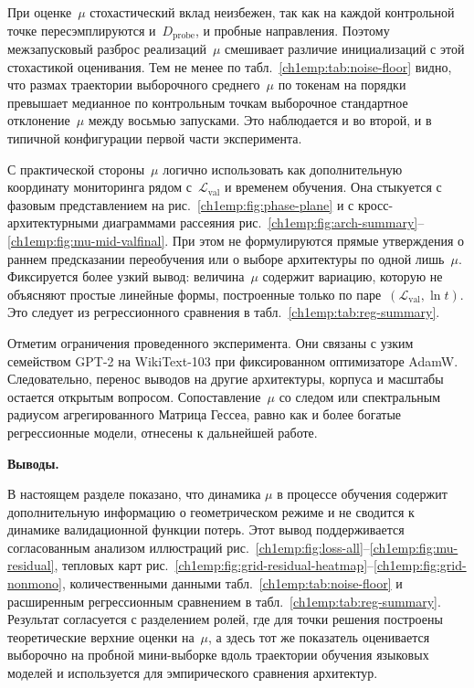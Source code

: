 При оценке~$\mu$ стохастический вклад неизбежен, так как на каждой контрольной точке пересэмплируются и~$D_{\mathrm{probe}}$, и пробные направления.
Поэтому межзапусковый разброс реализаций~$\mu$ смешивает различие инициализаций с этой стохастикой оценивания.
Тем не менее по табл.~\ref{ch1emp:tab:noise-floor} видно, что размах траектории выборочного среднего~$\mu$ по токенам на порядки превышает медианное по контрольным точкам выборочное стандартное отклонение~$\mu$ между восьмью запусками.
Это наблюдается и во второй, и в типичной конфигурации первой части эксперимента.

С практической стороны~$\mu$ логично использовать как дополнительную координату мониторинга рядом с~$\mathcal{L}_{\mathrm{val}}$ и временем обучения.
Она стыкуется с фазовым представлением на рис.~\ref{ch1emp:fig:phase-plane} и с кросс-архитектурными диаграммами рассеяния рис.~\ref{ch1emp:fig:arch-summary}--\ref{ch1emp:fig:mu-mid-valfinal}.
При этом не формулируются прямые утверждения о раннем предсказании переобучения или о выборе архитектуры по одной лишь~$\mu$.
Фиксируется более узкий вывод: величина~$\mu$ содержит вариацию, которую не объясняют простые линейные формы, построенные только по паре~$(\mathcal{L}_{\mathrm{val}},\ln t)$. Это следует из регрессионного сравнения в табл.~\ref{ch1emp:tab:reg-summary}.

Отметим ограничения проведенного эксперимента.
Они связаны с узким семейством GPT-2 на WikiText-103 при фиксированном оптимизаторе AdamW. Следовательно, перенос выводов на другие архитектуры, корпуса и масштабы остается открытым вопросом.
Сопоставление~$\mu$ со следом или спектральным радиусом агрегированного Матрица Гессеа, равно как и более богатые регрессионные модели, отнесены к дальнейшей работе.

\textbf{Выводы.}

В настоящем разделе показано, что динамика $\mu$ в процессе обучения содержит дополнительную информацию о геометрическом режиме и не сводится к динамике валидационной функции потерь.
Этот вывод поддерживается согласованным анализом иллюстраций рис.~\ref{ch1emp:fig:loss-all}--\ref{ch1emp:fig:mu-residual}, тепловых карт рис.~\ref{ch1emp:fig:grid-residual-heatmap}--\ref{ch1emp:fig:grid-nonmono}, количественными данными табл.~\ref{ch1emp:tab:noise-floor} и расширенным регрессионным сравнением в табл.~\ref{ch1emp:tab:reg-summary}.
Результат согласуется с разделением ролей, где для точки решения построены теоретические верхние оценки на~$\mu$, а здесь тот же показатель оценивается выборочно на пробной мини-выборке вдоль траектории обучения языковых моделей и используется для эмпирического сравнения архитектур.


